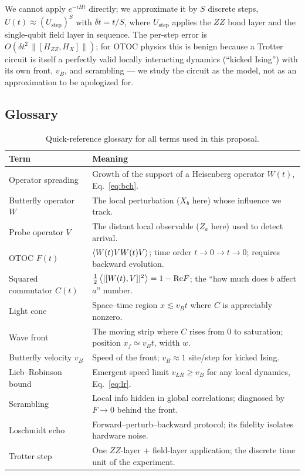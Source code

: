 \documentclass[11pt]{article}
\begin{document}
We cannot apply $e^{-iHt}$ directly; we approximate it by $S$ discrete steps,
$U(t) \approx (U_{\mathrm{step}})^S$ with $\delta t = t/S$, where
$U_{\mathrm{step}}$ applies the $ZZ$ bond layer and the single-qubit field
layer in sequence. The per-step error is $O(\delta t^2\,\|[H_{ZZ},H_X]\|)$;
for OTOC physics this is benign because a Trotter circuit is itself a
perfectly valid locally interacting dynamics (``kicked Ising'') with its own
front, $v_B$, and scrambling --- we study the circuit as the model, not as an
approximation to be apologized for.

\subsection{Glossary}

\begin{table}[h]
\centering
\small
\begin{tabular}{p{3.4cm} p{10.6cm}}
\toprule
Term & Meaning \\
\midrule
Operator spreading & Growth of the support of a Heisenberg operator $W(t)$, Eq.~\eqref{eq:bch}. \\
Butterfly operator $W$ & The local perturbation ($X_b$ here) whose influence we track. \\
Probe operator $V$ & The distant local observable ($Z_a$ here) used to detect arrival. \\
OTOC $F(t)$ & $\expval{W(t)VW(t)V}$; time order $t\to0\to t\to0$; requires backward evolution. \\
Squared commutator $C(t)$ & $\frac12\expval{|[W(t),V]|^2} = 1-\mathrm{Re}F$; the ``how much does $b$ affect $a$'' number. \\
Light cone & Space--time region $x \lesssim v_B t$ where $C$ is appreciably nonzero. \\
Wave front & The moving strip where $C$ rises from $0$ to saturation; position $x_f\simeq v_B t$, width $w$. \\
Butterfly velocity $v_B$ & Speed of the front; $v_B\approx1$ site/step for kicked Ising. \\
Lieb--Robinson bound & Emergent speed limit $v_{LR}\geq v_B$ for any local dynamics, Eq.~\eqref{eq:lr}. \\
Scrambling & Local info hidden in global correlations; diagnosed by $F\to0$ behind the front. \\
Loschmidt echo & Forward--perturb--backward protocol; its fidelity isolates hardware noise. \\
Trotter step & One $ZZ$-layer $+$ field-layer application; the discrete time unit of the experiment. \\
\bottomrule
\end{tabular}
\caption{Quick-reference glossary for all terms used in this proposal.}
\label{tab:glossary}
\end{table}
\end{document}
